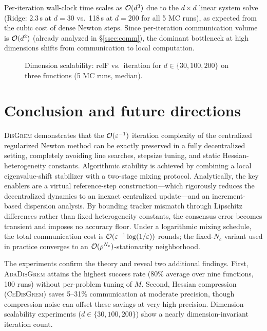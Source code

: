 \documentclass[review,onefignum,onetabnum]{siamart171218}
\begin{document}
	Per-iteration wall-clock time scales as $\mathcal{O}(d^3)$ due to the
	$d\times d$ linear system solve (Ridge: 2.3\,s at $d{=}30$ vs.\
	118\,s at $d{=}200$ for all 5 MC runs), as expected from the cubic
	cost of dense Newton steps.
	Since per-iteration communication volume is $\mathcal{O}(d^2)$
	(already analyzed in \S\ref{ssec:comm}), the dominant bottleneck
	at high dimensions shifts from communication to local computation.

	\begin{figure}[htbp]
		\centering
		\caption{Dimension scalability: relF vs.\ iteration for
		$d\in\{30,100,200\}$ on three functions (5 MC runs, median).}
		\label{fig:scalability}
	\end{figure}
	
	
\section{Conclusion and future directions}\label{sec:conclusion}

	\textsc{DisGrem} demonstrates that the $\mathcal{O}(\varepsilon^{-1})$ iteration
	complexity of the centralized regularized Newton method can be exactly
	preserved in a fully decentralized setting, completely avoiding line searches,
	stepsize tuning, and static Hessian-heterogeneity constants.
	Algorithmic stability is achieved by combining a local eigenvalue-shift
	stabilizer with a two-stage mixing protocol. Analytically, the key
	enablers are a virtual reference-step construction---which rigorously
	reduces the decentralized dynamics to an inexact centralized update---and
	an increment-based dispersion analysis. By bounding tracker mismatch
	through Lipschitz differences rather than fixed heterogeneity constants,
	the consensus error becomes transient and imposes no accuracy floor.
	Under a logarithmic mixing schedule, the total communication cost
	is $\mathcal{O}(\varepsilon^{-1}\log(1/\varepsilon))$ rounds; the
	fixed-$N_c$ variant used in practice converges to an
	$\mathcal{O}(\rho^{N_c})$-stationarity neighborhood.

	The experiments confirm the theory and reveal two additional findings.
	First, \textsc{AdaDisGrem} attains the highest success rate
	(80\% average over nine functions, 100 runs) without per-problem
	tuning of $M$.
	Second, Hessian compression (\textsc{CeDisGrem}) saves
	5--31\% communication at moderate precision, though
	compression noise can offset these savings at very high precision.
	Dimension-scalability experiments ($d\in\{30,100,200\}$) show
	a nearly dimension-invariant iteration count.
\end{document}
